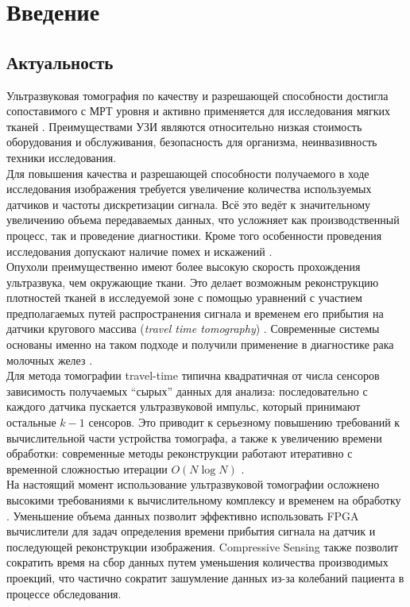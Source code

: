 \documentclass[14pt]{matmex-diploma}
\begin{document}
\section{Введение}

\subsection{Актуальность}
Ультразвуковая томография по качеству и разрешающей способности достигла сопоставимого с МРТ уровня и активно применяется для исследования мягких тканей \cite{hopp2014breast}.
Преимуществами УЗИ являются относительно низкая стоимость оборудования и обслуживания, безопасность для организма, неинвазивность техники исследования. \\

Для повышения качества и разрешающей способности получаемого в ходе исследования изображения требуется увеличение количества используемых датчиков и частоты дискретизации сигнала. Всё это ведёт к значительному увеличению объема передаваемых данных, что усложняет как производственный процесс, так и проведение диагностики. Кроме того особенности проведения исследования допускают наличие помех и искажений \cite{shannon_th}. \\

Опухоли преимущественно имеют более высокую скорость прохождения ультразвука, чем окружающие ткани. Это делает возможным реконструкцию плотностей тканей в исследуемой зоне с помощью уравнений с участием предполагаемых путей распространения сигнала и временем его прибытия на датчики кругового массива (\textit{travel time tomography}) \cite{quan2007sound}. Современные системы основаны именно на таком подходе и получили применение в диагностике рака молочных желез \cite{hormati2010robust}\cite{schreiman1984ultrasound}. \\

Для метода томографии travel-time типична квадратичная от числа сенсоров зависимость получаемых ``сырых'' данных для анализа: последовательно с каждого датчика пускается ультразвуковой импульс, который принимают остальные $k-1$ сенсоров. Это приводит к серьезному повышению требований к вычислительной части устройства томографа, а также к увеличению времени обработки: современные методы реконструкции работают итеративно с временной сложностью итерации $O(N\log N)$ \cite{chen2012compressive}. \\

На настоящий момент использование ультразвуковой томографии осложнено высокими требованиями к вычислительному комплексу и временем на обработку \cite{ozmen2014ultrasound}. Уменьшение объема данных позволит эффективно использовать FPGA вычислители для задач определения времени прибытия сигнала на датчик и последующей реконструкции изображения. Compressive Sensing также позволит сократить время на сбор данных путем уменьшения количества производимых проекций, что частично сократит зашумление данных из-за колебаний пациента в процессе обследования.
\end{document}
